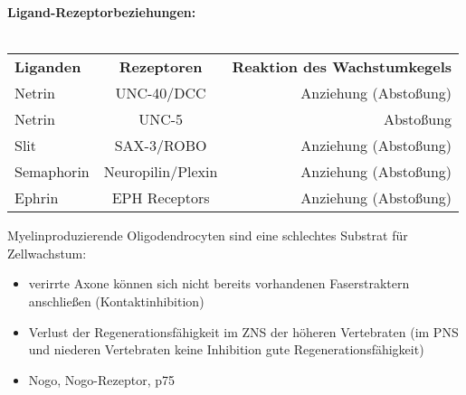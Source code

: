 \textbf{Ligand-Rezeptorbeziehungen:}\\\\
\begin{tabular}{lcr}
	\textbf{Liganden} & \textbf{Rezeptoren} & \textbf{Reaktion des Wachstumkegels}\\
	Netrin & UNC-40/DCC & Anziehung (Abstoßung)\\
	Netrin & UNC-5 & Abstoßung\\
	Slit & SAX-3/ROBO & Anziehung (Abstoßung)\\
	Semaphorin & Neuropilin/Plexin & Anziehung (Abstoßung)\\
	Ephrin & EPH Receptors & Anziehung (Abstoßung)\\
\end{tabular}

Myelinproduzierende Oligodendrocyten sind eine schlechtes Substrat für
Zellwachstum:
\begin{itemize}
	\item verirrte Axone können sich nicht bereits vorhandenen Faserstraktern anschließen (Kontaktinhibition)
	\item Verlust der Regenerationsfähigkeit im ZNS der höheren Vertebraten (im PNS und niederen Vertebraten keine Inhibition gute
Regenerationsfähigkeit)
	\item Nogo, Nogo-Rezeptor, p75
\end{itemize}